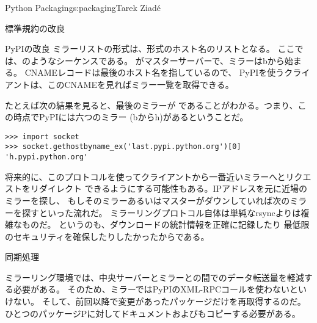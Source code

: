\begin{aosachapter}{Python Packaging}{s:packaging}{Tarek Ziad\'{e}}
\begin{aosasect1}{標準規約の改良}
\begin{aosasect2}{PyPIの改良}
ミラーリストの形式は、形式のホスト名のリストとなる。
ここでは、のようなシーケンスである。
がマスターサーバーで、ミラーはbから始まる。
CNAMEレコードは最後のホスト名を指しているので、
PyPIを使うクライアントは、このCNAMEを見ればミラー一覧を取得できる。

たとえば次の結果を見ると、最後のミラーが
であることがわかる。つまり、この時点でPyPIには六つのミラー
(bからh)があるということだ。

\begin{verbatim}
>>> import socket
>>> socket.gethostbyname_ex('last.pypi.python.org')[0]
'h.pypi.python.org'
\end{verbatim}

\noindent
将来的に、このプロトコルを使ってクライアントから一番近いミラーへとリクエストをリダイレクト
できるようにする可能性もある。IPアドレスを元に近場のミラーを探し、
もしそのミラーあるいはマスターがダウンしていれば次のミラーを探すといった流れだ。
ミラーリングプロトコル自体は単純なrsyncよりは複雑なものだ。
というのも、ダウンロードの統計情報を正確に記録したり
最低限のセキュリティを確保したりしたかったからである。

\begin{aosasect3}{同期処理}

ミラーリング環境では、中央サーバーとミラーとの間でのデータ転送量を軽減する必要がある。
そのため、ミラーではPyPIのXML-RPCコールを使わないといけない。
そして、前回以降で変更があったパッケージだけを再取得するのだ。
ひとつのパッケージPに対してドキュメントおよびもコピーする必要がある。


\end{aosasect3}
\end{aosasect2}
\end{aosasect1}
\end{aosachapter}
